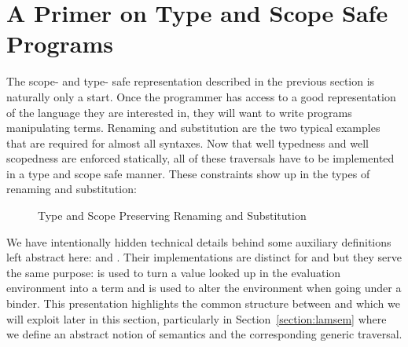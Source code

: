 \begin{center}
  \label{figure:apply}
\end{center}




\section{A Primer on Type and Scope Safe Programs}\label{section:primer-program}

The scope- and type- safe representation described in the previous
section is naturally only a start. Once the programmer has access to a
good representation of the language they are interested in, they will
want to write programs manipulating terms.  Renaming and substitution
are the two typical examples that are required for almost all
syntaxes. Now that well typedness and well scopedness are enforced
statically, all of these traversals have to be implemented in a type
and scope safe manner.  These constraints show up in the types of
renaming and substitution: %

\begin{figure}[h]
\begin{minipage}{0.50\textwidth}
\end{minipage}\hfill
\begin{minipage}{0.50\textwidth}
\end{minipage}
\caption{Type and Scope Preserving Renaming and Substitution}
\label{figure:rensubACMM}
\end{figure}

We have intentionally hidden technical details behind some auxiliary definitions
left abstract here:  and . Their implementations are distinct
for  and  but they serve the same purpose:  is used to
turn a value looked up in the evaluation environment into a term and 
is used to alter the environment when going under a binder. This presentation
highlights the common structure between  and  which we will exploit
later in this section, particularly in Section~\ref{section:lamsem}
where we define an abstract notion of semantics and the corresponding generic traversal.

